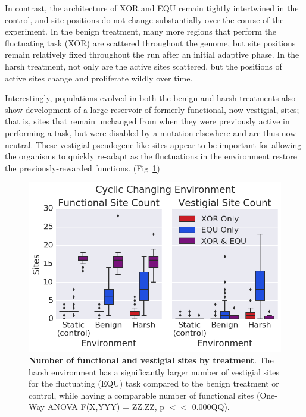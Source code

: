 \documentclass[PhD]{msu-thesis}
\begin{document}
In contrast, the architecture of XOR and EQU remain tightly intertwined in the control, and site positions do not change substantially over the course of the experiment. In the benign treatment, many more regions that perform the fluctuating task (XOR) are scattered throughout the genome, but site positions remain relatively fixed throughout the run after an initial adaptive phase. In the harsh treatment, not only are the active sites scattered, but the positions of active sites change and proliferate wildly over time.

Interestingly, populations evolved in both the benign and harsh treatments also show development of a large reservoir of formerly functional, now vestigial, sites; that is, sites that remain unchanged from when they were previously active in performing a task, but were disabled by a mutation elsewhere and are thus now neutral. These vestigial pseudogene-like sites appear to be important for allowing the organisms to quickly re-adapt as the fluctuations in the environment restore the previously-rewarded functions. (Fig~\ref{fig:CCE_func_vestigial})

	\begin{figure}[!h]
	\includegraphics[trim={0 0 0 0}, clip, width=0.75\columnwidth]{figures/CE/CCE_func_vest__box.png}
	\caption{\textbf{Number of functional and vestigial sites by treatment}. The harsh environment has a significantly larger number of vestigial sites for the fluctuating (EQU) task compared to the benign treatment or control, while having a comparable number of functional sites (One-Way ANOVA F(X,YYY) = ZZ.ZZ, p $<<$ 0.000QQ).
	}
	\label{fig:CCE_func_vestigial} %
	\end{figure}
\end{document}
